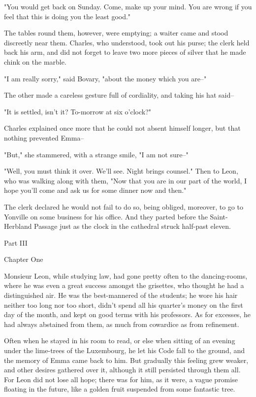 \documentclass[11pt,twocolumn]{ltugboat}
\begin{document}
"You would get back on Sunday. Come, make up your mind. You are wrong if
you feel that this is doing you the least good."

The tables round them, however, were emptying; a waiter came and stood
discreetly near them. Charles, who understood, took out his purse; the
clerk held back his arm, and did not forget to leave two more pieces of
silver that he made chink on the marble.

"I am really sorry," said Bovary, "about the money which you are--"

The other made a careless gesture full of cordiality, and taking his hat
said--

"It is settled, isn't it? To-morrow at six o'clock?"

Charles explained once more that he could not absent himself longer, but
that nothing prevented Emma--

"But," she stammered, with a strange smile, "I am not sure--"

"Well, you must think it over. We'll see. Night brings counsel." Then to
Leon, who was walking along with them, "Now that you are in our part of
the world, I hope you'll come and ask us for some dinner now and then."

The clerk declared he would not fail to do so, being obliged, moreover,
to go to Yonville on some business for his office. And they parted
before the Saint-Herbland Passage just as the clock in the cathedral
struck half-past eleven.




Part III



Chapter One

Monsieur Leon, while studying law, had gone pretty often to the
dancing-rooms, where he was even a great success amongst the grisettes,
who thought he had a distinguished air. He was the best-mannered of the
students; he wore his hair neither too long nor too short, didn't spend
all his quarter's money on the first day of the month, and kept on good
terms with his professors. As for excesses, he had always abstained from
them, as much from cowardice as from refinement.

Often when he stayed in his room to read, or else when sitting of an
evening under the lime-trees of the Luxembourg, he let his Code fall to
the ground, and the memory of Emma came back to him. But gradually this
feeling grew weaker, and other desires gathered over it, although it
still persisted through them all. For Leon did not lose all hope; there
was for him, as it were, a vague promise floating in the future, like a
golden fruit suspended from some fantastic tree.
\end{document}
